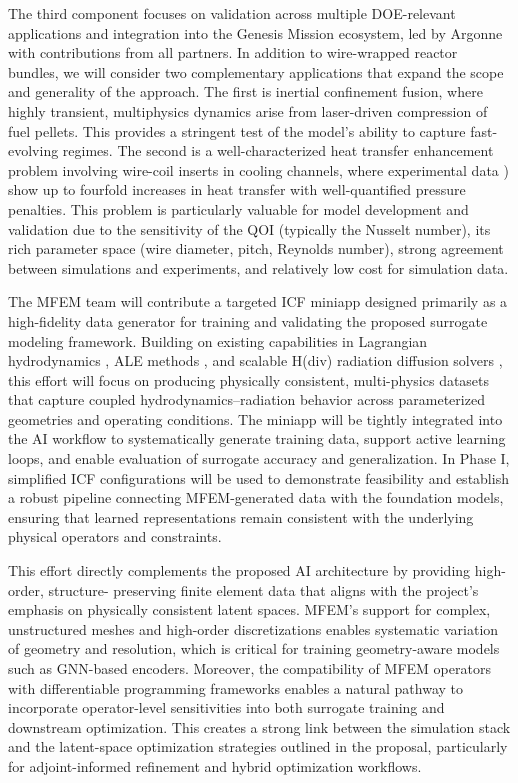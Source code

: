 The third component focuses on validation across multiple DOE-relevant
applications and integration into the Genesis Mission ecosystem, led by Argonne
with contributions from all partners. In addition to wire-wrapped reactor
bundles, we will consider two complementary applications that expand the scope
and generality of the approach. The first is inertial confinement fusion, where
highly transient, multiphysics dynamics arise from laser-driven compression of
fuel pellets. This provides a stringent test of the model’s ability to capture
fast-evolving regimes. The second is a well-characterized heat transfer
enhancement problem involving wire-coil inserts in cooling channels, where
experimental data \cite{collins22}) show up to fourfold increases in heat
transfer with well-quantified pressure penalties.
%
   This problem is particularly valuable for model development and validation
due to the sensitivity of the QOI (typically the Nusselt number), its rich
parameter space (wire diameter, pitch, Reynolds number), strong agreement
between simulations and experiments, and relatively low cost for simulation data.

The MFEM team will contribute a targeted ICF miniapp designed primarily as a
high-fidelity data generator for training and validating the proposed surrogate
modeling framework. Building on existing capabilities in Lagrangian
hydrodynamics \cite{Dobrev2012}, ALE methods \cite{Tomov2018}, and scalable
H(div) radiation diffusion solvers \cite{Pazner2025}, this effort will focus on
producing physically consistent, multi-physics datasets that capture coupled
hydrodynamics–radiation behavior across parameterized geometries and operating
conditions. The miniapp will be tightly integrated into the AI workflow to
systematically generate training data, support active learning loops, and
enable evaluation of surrogate accuracy and generalization. In Phase I,
simplified ICF configurations will be used to demonstrate feasibility and
establish a robust pipeline connecting MFEM-generated data with the foundation
models, ensuring that learned representations remain consistent with the
underlying physical operators and constraints.

This effort directly complements the proposed AI architecture by providing
high-order, structure- preserving finite element data that aligns with the
project’s emphasis on physically consistent latent spaces. MFEM’s support for
complex, unstructured meshes and high-order discretizations enables systematic
variation of geometry and resolution, which is critical for training
geometry-aware models such as GNN-based encoders. Moreover, the compatibility
of MFEM operators with differentiable programming frameworks enables a natural
pathway to incorporate operator-level sensitivities into both surrogate
training and downstream optimization. This creates a strong link between the
simulation stack and the latent-space optimization strategies outlined in the
proposal, particularly for adjoint-informed refinement and hybrid optimization
workflows.


